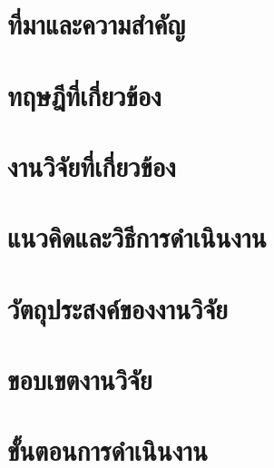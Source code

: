 \documentclass[16pt,a4paper]{article}
\begin{document}
    \section{ที่มาและความสำคัญ}
    

    \section{ทฤษฎีที่เกี่ยวข้อง}
    

    \section{งานวิจัยที่เกี่ยวข้อง}
    

    \section{แนวคิดและวิธีการดำเนินงาน}
    

    \section{วัตถุประสงค์ของงานวิจัย}
    

    \section{ขอบเขตงานวิจัย}
    

    \section{ขั้นตอนการดำเนินงาน}
    
\end{document}
